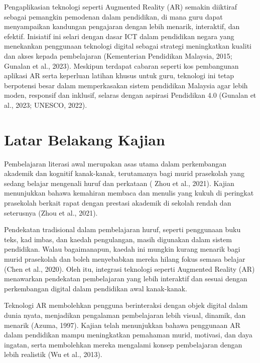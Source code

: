 \hspace{1cm}Pengaplikasian teknologi seperti Augmented Reality (AR) semakin diiktiraf sebagai pemangkin pemodenan dalam pendidikan, di mana guru dapat menyampaikan kandungan pengajaran dengan lebih menarik, interaktif, dan efektif. Inisiatif ini selari dengan dasar ICT dalam pendidikan negara yang menekankan penggunaan teknologi digital sebagai strategi meningkatkan kualiti dan akses kepada pembelajaran (Kementerian Pendidikan Malaysia, 2015; Gunalan et al., 2023). Meskipun terdapat cabaran seperti kos pembangunan aplikasi AR serta keperluan latihan khusus untuk guru, teknologi ini tetap berpotensi besar dalam memperkasakan sistem pendidikan Malaysia agar lebih moden, responsif dan inklusif, selaras dengan aspirasi Pendidikan 4.0 (Gunalan et al., 2023; UNESCO, 2022).


\section{ Latar Belakang Kajian}

\vspace{1em}

Pembelajaran literasi awal merupakan asas utama dalam perkembangan akademik dan kognitif kanak-kanak, terutamanya bagi murid prasekolah yang sedang belajar mengenali huruf dan perkataan ( Zhou et al., 2021). Kajian menunjukkan bahawa kemahiran membaca dan menulis yang kukuh di peringkat prasekolah berkait rapat dengan prestasi akademik di sekolah rendah dan seterusnya (Zhou et al., 2021).

\hspace{1cm}Pendekatan tradisional dalam pembelajaran huruf, seperti penggunaan buku teks, kad imbas, dan kaedah pengulangan, masih digunakan dalam sistem pendidikan. Walau bagaimanapun, kaedah ini mungkin kurang menarik bagi murid prasekolah dan boleh menyebabkan mereka hilang fokus semasa belajar (Chen et al., 2020). Oleh itu, integrasi teknologi seperti Augmented Reality (AR) menawarkan pendekatan pembelajaran yang lebih interaktif dan sesuai dengan perkembangan digital dalam pendidikan awal kanak-kanak.

\hspace{1cm}Teknologi AR membolehkan pengguna berinteraksi dengan objek digital dalam dunia nyata, menjadikan pengalaman pembelajaran lebih visual, dinamik, dan menarik (Azuma, 1997). Kajian telah menunjukkan bahawa penggunaan AR dalam pendidikan mampu meningkatkan pemahaman murid, motivasi, dan daya ingatan, serta membolehkan mereka mengalami konsep pembelajaran dengan lebih realistik (Wu et al., 2013).

